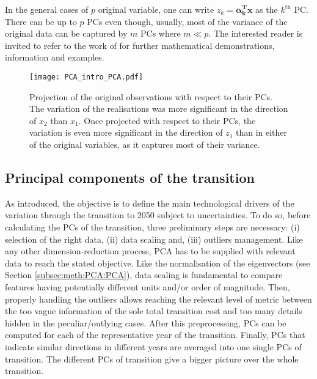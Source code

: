 In the general cases of $p$ original variable, one can write $z_k=\mathbf{\alpha_k^{T}x}$ as the $k^{\text{th}}$ PC. There can be up to $p$ PCs even though, usually, most of the variance of the original data can be captured by $m$ PCs where $m\ll p$. The interested reader is invited to refer to the work of \citet{jolliffe2002principal} for further mathematical demonstrations, information and examples.

\begin{figure}[!htbp]
\centering
\texttt{[image: PCA\_intro\_PCA.pdf]}
\caption{Projection of the original observations with respect to their PCs. The variation of the realisations was more significant in the direction of $x_2$ than $x_1$. Once projected with respect to their PCs, the variation is even more significant in the direction of $z_1$ than in either of the original variables, as it captures most of their variance. }
\label{fig:PCA_intro_PCA}
\end{figure}

\subsection{Principal components of the transition}
\label{subsec:meth:PCA:transition}
As introduced, the objective is to define the main technological drivers of the variation through the transition to 2050 subject to uncertainties. To do so, before calculating the PCs of the transition, three preliminary steps are necessary: (i) selection of the right data, (ii) data scaling and, (iii) outliers management. Like any other dimension-reduction process, \gls{PCA} has to be supplied with relevant data to reach the stated objective.  Like the normalisation of the eigenvectors (see Section \ref{subsec:meth:PCA:PCA}), data scaling is fundamental to compare features having potentially different units and/or order of magnitude. Then, properly handling the outliers allows reaching the relevant level of metric between the too vague information of the sole total transition cost and too many details hidden in the peculiar/outlying cases. After this preprocessing, PCs can be computed for each of the representative year of the transition. Finally, PCs that indicate similar directions in different years are averaged into one single PCs of transition. The different PCs of transition give a bigger picture over the whole transition.\\

\\

